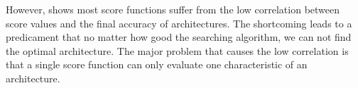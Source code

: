 \documentclass[sigconf]{acmart}
\begin{document}
    However,  shows most score functions suffer 
    from the low correlation between score values and the final accuracy of 
    architectures. The shortcoming leads to a predicament that no matter how good the 
    searching algorithm, we can not find the optimal architecture. %
    The major problem that causes the low correlation is that a single score 
    function can only evaluate one characteristic of an architecture. 
    \begin{table}[tb]
        \caption{\textsc{The Kendall correlation between training-free score and test accuracy, evaluated on the three datasets of NATS-Bench-TSS \cite{Dong_2021}. }}
    \end{table}
\end{document}
